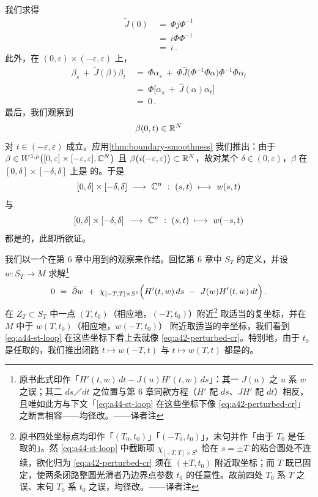 我们求得
\begin{align*}
\tilde{J}(0)\ &=\ \Phi j\Phi^{-1}\\
&=\ i\Phi\Phi^{-1}\\
&=\ i\,.
\end{align*}
此外，在 $(0,\varepsilon)\times(-\varepsilon,\varepsilon)$ 上，
\begin{align*}
\beta_{s}\ +\ \tilde{J}(\beta)\beta_{t}\ &=\ \Phi\alpha_{s}\ +\ \Phi\hat{J}\bigl(\Phi^{-1}\Phi\alpha\bigr)\Phi^{-1}\Phi\alpha_{t}\\
&=\ \Phi\bigl[\alpha_{s}\ +\ \hat{J}(\alpha)\alpha_{t}\bigr]\\
&=\ 0\,.
\end{align*}
最后，我们观察到
\[
\beta(0,t)\in\mathbb{R}^{N}
\]
对 $t\in(-\varepsilon,\varepsilon)$ 成立。应用\cref{thm:boundary-smoothness} %
我们推出：由于 $\beta\in W^{1,p}\bigl([0,\varepsilon]\times[-\varepsilon,\varepsilon],\mathbb{C}^{N}\bigr)$ %
且 $\beta\bigl(i(-\varepsilon,\varepsilon)\bigr)\subset\mathbb{R}^{N}$，故对某个%
 $\delta\in(0,\varepsilon)$，$\beta$ 在 $[0,\delta]\times[-\delta,\delta]$ 上是%
\trSmooth{}的。于是
\[
[0,\delta]\times[-\delta,\delta]\ \longrightarrow\ \C^{n}\ :\ (s,t)\ \longmapsto\ w(s,t)
\]
与
\[
[0,\delta]\times[-\delta,\delta]\ \longrightarrow\ \C^{n}\ :\ (s,t)\ \longmapsto\ w(-s,t)
\]
都是\trSmooth{}的，此即所欲证。

我们以一个在第 6 章中用到的观察来作结。回忆第 6 章中 $S_{T}$ 的定义，并设%
 $w:S_{T}\to M$ 求解\footnote{原书此式印作「$H'(t,w)\,dt-J(u)H'(t,w)\,ds$」：其一 $J(u)$ 之 $u$ 系 $w$ 之误；其二 $ds$／$dt$ 之位置与第 6 章同款方程（$H'$ 配 $ds$、$JH'$ 配 $dt$）相反，且唯如此方与下文「\eqref{eq:a44-st-loop} 在这些坐标下像 \eqref{eq:a42-perturbed-cr}」之断言相容——均径改。——译者注}
\begin{equation}\label{eq:a44-st-loop}
0\ =\ \bar{\partial}w\ +\ \chi_{[-T,T]\times S^{1}}\Bigl(H'(t,w)\,ds\ -\ J(w)H'(t,w)\,dt\Bigr)\,.
\end{equation}
在 $Z_{T}\subset S_{T}$ 中一点 $(T,t_{0})$（相应地，$(-T,t_{0})$）附近\footnote{原书四处坐标点均印作「$(T_{0},t_{0})$」「$(-T_{0},t_{0})$」，末句并作「由于 $T_{0}$ 是任取的」。然 \eqref{eq:a44-st-loop} 中截断项 $\chi_{[-T,T]\times S^{1}}$ 恰在 $s=\pm T$ 的粘合圆处不连续，欲化归为 \eqref{eq:a42-perturbed-cr} 须在 $(\pm T,t_{0})$ 附近取坐标；而 $T$ 既已固定，使两条闭路整圆光滑者乃边界点参数 $t_{0}$ 的任意性。故前四处 $T_{0}$ 系 $T$ 之误、末句 $T_{0}$ 系 $t_{0}$ 之误，均径改。——译者注}%
取适当的复坐标，并在 $M$ 中于 $w(T,t_{0})$（相应地，$w(-T,t_{0})$）%
附近取适当的辛坐标，我们看到 \eqref{eq:a44-st-loop} 在这些坐标下看上去就像%
 \eqref{eq:a42-perturbed-cr}。特别地，由于 $t_{0}$ 是任取的，我们推出闭路%
 $t\mapsto w(-T,t)$ 与 $t\mapsto w(T,t)$ 都是\trSmooth{}的。
